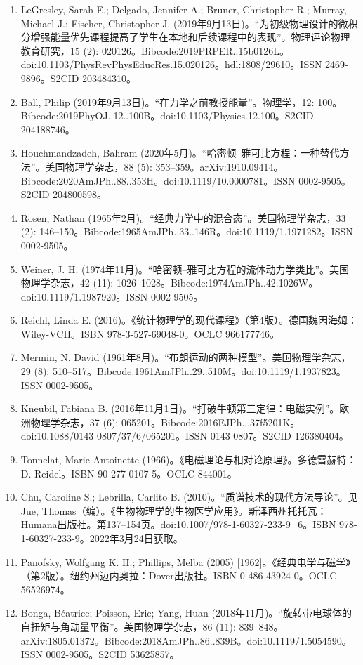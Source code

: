\begin{enumerate}
\item LeGresley, Sarah E.; Delgado, Jennifer A.; Bruner, Christopher R.; Murray, Michael J.; Fischer, Christopher J. (2019年9月13日)。“为初级物理设计的微积分增强能量优先课程提高了学生在本地和后续课程中的表现”。物理评论物理教育研究，15 (2): 020126。Bibcode:2019PRPER..15b0126L。doi:10.1103/PhysRevPhysEducRes.15.020126。hdl:1808/29610。ISSN 2469-9896。S2CID 203484310。
\item Ball, Philip (2019年9月13日)。“在力学之前教授能量”。物理学，12: 100。Bibcode:2019PhyOJ..12..100B。doi:10.1103/Physics.12.100。S2CID 204188746。
\item Houchmandzadeh, Bahram (2020年5月)。“哈密顿–雅可比方程：一种替代方法”。美国物理学杂志，88 (5): 353–359。arXiv:1910.09414。Bibcode:2020AmJPh..88..353H。doi:10.1119/10.0000781。ISSN 0002-9505。S2CID 204800598。
\item Rosen, Nathan (1965年2月)。“经典力学中的混合态”。美国物理学杂志，33 (2): 146–150。Bibcode:1965AmJPh..33..146R。doi:10.1119/1.1971282。ISSN 0002-9505。
\item Weiner, J. H. (1974年11月)。“哈密顿–雅可比方程的流体动力学类比”。美国物理学杂志，42 (11): 1026–1028。Bibcode:1974AmJPh..42.1026W。doi:10.1119/1.1987920。ISSN 0002-9505。
\item Reichl, Linda E. (2016)。《统计物理学的现代课程》（第4版）。德国魏因海姆：Wiley-VCH。ISBN 978-3-527-69048-0。OCLC 966177746。
\item Mermin, N. David (1961年8月)。“布朗运动的两种模型”。美国物理学杂志，29 (8): 510–517。Bibcode:1961AmJPh..29..510M。doi:10.1119/1.1937823。ISSN 0002-9505。
\item Kneubil, Fabiana B. (2016年11月1日)。“打破牛顿第三定律：电磁实例”。欧洲物理学杂志，37 (6): 065201。Bibcode:2016EJPh...37f5201K。doi:10.1088/0143-0807/37/6/065201。ISSN 0143-0807。S2CID 126380404。
\item Tonnelat, Marie-Antoinette (1966)。《电磁理论与相对论原理》。多德雷赫特：D. Reidel。ISBN 90-277-0107-5。OCLC 844001。
\item Chu, Caroline S.; Lebrilla, Carlito B. (2010)。“质谱技术的现代方法导论”。见 Jue, Thomas（编）。《生物物理学的生物医学应用》。新泽西州托托瓦：Humana出版社。第137–154页。doi:10.1007/978-1-60327-233-9_6。ISBN 978-1-60327-233-9。2022年3月24日获取。
\item Panofsky, Wolfgang K. H.; Phillips, Melba (2005) [1962]。《经典电学与磁学》（第2版）。纽约州迈内奥拉：Dover出版社。ISBN 0-486-43924-0。OCLC 56526974。
\item Bonga, Béatrice; Poisson, Eric; Yang, Huan (2018年11月)。“旋转带电球体的自扭矩与角动量平衡”。美国物理学杂志，86 (11): 839–848。arXiv:1805.01372。Bibcode:2018AmJPh..86..839B。doi:10.1119/1.5054590。ISSN 0002-9505。S2CID 53625857。

\end{enumerate}
